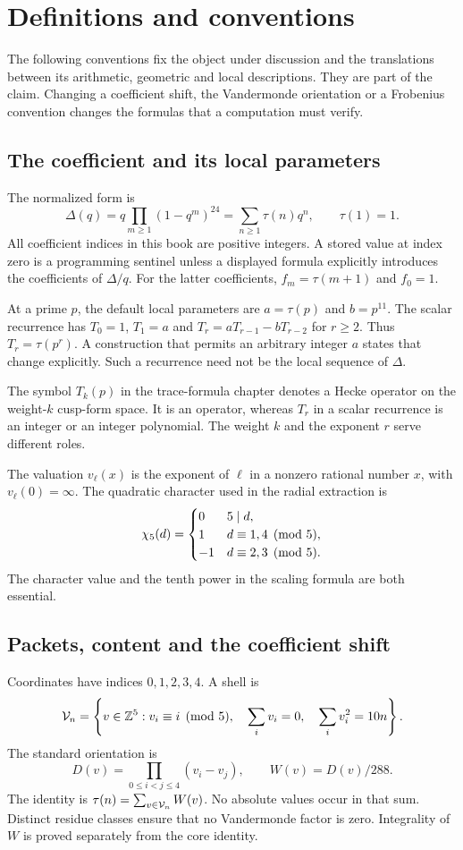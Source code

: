 \chapter{Definitions and conventions}\label{app:definitions}

The following conventions fix the object under discussion and the translations between its arithmetic, geometric and local descriptions. They are part of the claim. Changing a coefficient shift, the Vandermonde orientation or a Frobenius convention changes the formulas that a computation must verify.

\section{The coefficient and its local parameters}
The normalized form is
\[
\Delta(q)=q\prod_{m\ge1}(1-q^m)^{24}
         =\sum_{n\ge1}\tau(n)q^n,\qquad \tau(1)=1.
\]
All coefficient indices in this book are positive integers. A stored value at index zero is a programming sentinel unless a displayed formula explicitly introduces the coefficients of $\Delta/q$. For the latter coefficients, $f_m=\tau(m+1)$ and $f_0=1$.

At a prime $p$, the default local parameters are $a=\tau(p)$ and $b=p^{11}$. The scalar recurrence has $T_0=1$, $T_1=a$ and $T_r=aT_{r-1}-bT_{r-2}$ for $r\ge2$. Thus $T_r=\tau(p^r)$. A construction that permits an arbitrary integer $a$ states that change explicitly. Such a recurrence need not be the local sequence of $\Delta$.

The symbol $T_k(p)$ in the trace-formula chapter denotes a Hecke operator on the weight-$k$ cusp-form space. It is an operator, whereas $T_r$ in a scalar recurrence is an integer or an integer polynomial. The weight $k$ and the exponent $r$ serve different roles.

The valuation $v_\ell(x)$ is the exponent of $\ell$ in a nonzero rational number $x$, with $v_\ell(0)=\infty$. The quadratic character used in the radial extraction is
\[
\chi_5(d)=
\begin{cases}
0&5\mid d,\\
1&d\equiv1,4\pmod5,\\
-1&d\equiv2,3\pmod5.
\end{cases}
\]
The character value and the tenth power in the scaling formula are both essential.

\section{Packets, content and the coefficient shift}
Coordinates have indices $0,1,2,3,4$. A shell is
\[
\mathcal V_n=\left\{v\in\mathbb Z^5:
v_i\equiv i\pmod5,\quad
\sum_i v_i=0,\quad
\sum_i v_i^2=10n\right\}.
\]
The standard orientation is
\[
D(v)=\prod_{0\le i<j\le4}(v_i-v_j),\qquad W(v)=D(v)/288.
\]
The identity is $\tau(n)=\sum_{v\in\mathcal V_n}W(v)$. No absolute values occur in that sum. Distinct residue classes ensure that no Vandermonde factor is zero. Integrality of $W$ is proved separately from the core identity.

